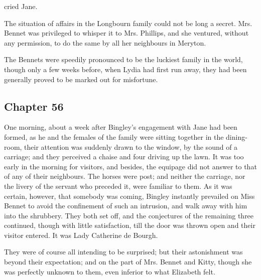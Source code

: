  cried Jane. 


The situation of affairs in the Longbourn family could not be long a secret. Mrs. Bennet was privileged to whisper it to Mrs. Phillips, and she ventured, without any permission, to do the same by all her neighbours in Meryton.

The Bennets were speedily pronounced to be the luckiest family in the world, though only a few weeks before, when Lydia had first run away, they had been generally proved to be marked out for misfortune.

\subsection[chapter-56]{\useURL[url56][][][]\from[url56] Chapter 56}

One morning, about a week after Bingley's engagement with Jane had been formed, as he and the females of the family were sitting together in the dining-room, their attention was suddenly drawn to the window, by the sound of a carriage; and they perceived a chaise and four driving up the lawn. It was too early in the morning for visitors, and besides, the equipage did not answer to that of any of their neighbours. The horses were post; and neither the carriage, nor the livery of the servant who preceded it, were familiar to them. As it was certain, however, that somebody was coming, Bingley instantly prevailed on Miss Bennet to avoid the confinement of such an intrusion, and walk away with him into the shrubbery. They both set off, and the conjectures of the remaining three continued, though with little satisfaction, till the door was thrown open and their visitor entered. It was Lady Catherine de Bourgh.

They were of course all intending to be surprised; but their astonishment was beyond their expectation; and on the part of Mrs. Bennet and Kitty, though she was perfectly unknown to them, even inferior to what Elizabeth felt.

